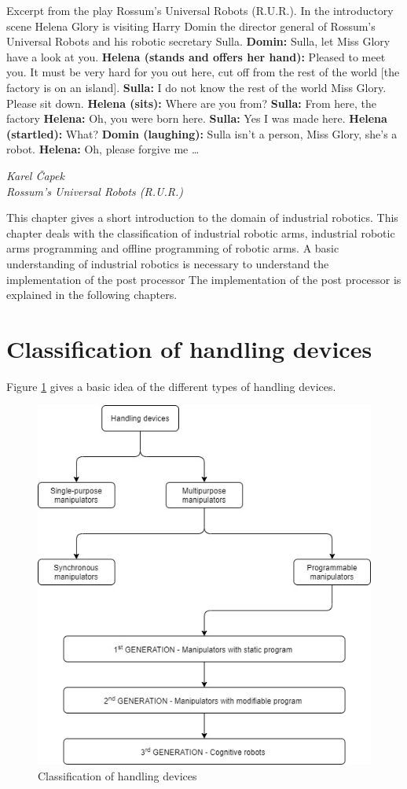 \label{chap:basics}

\epigraph{

Excerpt from the play Rossum’s Universal Robots (R.U.R.).\break
In the introductory scene Helena Glory is visiting Harry Domin the director general of Rossum’s Universal Robots and his robotic secretary Sulla.\break
\break
\textbf{Domin:} Sulla, let Miss Glory have a look at you.\break
\textbf{Helena (stands and offers her hand):} Pleased to meet you. It must be very hard for you out here, cut off from the rest of the world [the factory is on an island].\break
\textbf{Sulla:} I do not know the rest of the world Miss Glory. Please sit down.\break
\textbf{Helena (sits):} Where are you from?\break
\textbf{Sulla:} From here, the factory\break
\textbf{Helena:} Oh, you were born here.\break
\textbf{Sulla:} Yes I was made here.\break
\textbf{Helena (startled):} What?\break
\textbf{Domin (laughing):} Sulla isn’t a person, Miss Glory, she’s a robot.\break
\textbf{Helena:} Oh, please forgive me …
}{\textit{Karel Čapek \\ Rossum’s Universal Robots (R.U.R.)}}

This chapter gives a short introduction to the domain of industrial robotics. This chapter deals with the classification of industrial robotic arms, industrial robotic arms programming and offline programming of robotic arms. A basic understanding of industrial robotics is necessary to understand the implementation of the post processor The implementation of the post processor is explained in the following chapters.

\section{Classification of handling devices}

Figure \ref{fig:manipulators} gives a basic idea of the different types of handling devices. 

\begin{figure}[h]
    \centering
    \includegraphics[width=0.8\linewidth]{img/manipulators.jpg}
    \caption{Classification of handling devices \cite{vsb_2007}}
    \label{fig:manipulators}
\end{figure}

